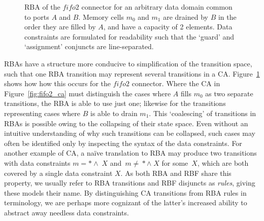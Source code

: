 \begin{figure}[ht]
	\centering
	\caption[RBA for fifo2 connector.]{RBA of the $fifo2$ connector for an arbitrary data domain common to ports $A$ and $B$. Memory cells $m_0$ and $m_1$ are drained by $B$ in the order they are filled by $A$, and have a capacity of 2 elements. Data constraints are formulated for readability such that the `guard' and `assignment' conjuncts are line-separated.}
	\label{fig:fifo2_rba}
\end{figure}


RBAs have a structure more conducive to simplification of the transition space, such that one RBA transition may represent several transitions in a CA. Figure~\ref{fig:fifo2_rba} shows how how this occurs for the $fifo2$ connector. Where the CA in Figure~\ref{fig:fifo2_ca} must distinguish the cases where $A$ fills $m_0$ as two separate transitions, the RBA is able to use just one; likewise for the transitions representing cases where $B$ is able to drain $m_1$. This `coalescing' of transitions in RBAs is possible owing to the collapsing of their state space. Even without an intuitive understanding of why such transitions can be collapsed, such cases may often be identified only by inspecting the syntax of the data constraints. For another example of CA, a na{\"i}ve translation to RBA may produce two transitions with data constraints $m=*\wedge{}\;X$ and~$m\neq{}*\wedge{}\;X$ for some~$X$, which are both covered by a single data constraint $X$. As both RBA and RBF share this property, we usually refer to RBA transitions and RBF disjuncts as \textit{rules}, giving these models their name. By distinguishing CA transitions from RBA rules in terminology, we are perhaps more cognizant of the latter's increased ability to abstract away needless data constraints. 

